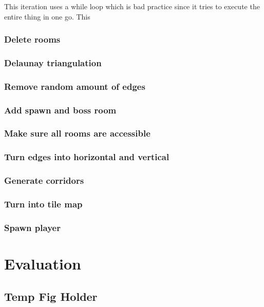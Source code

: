 \documentclass{article}
\begin{document}
This iteration uses a while loop which is bad practice since it tries to execute the entire thing in one go. This 

\subsubsection{Delete rooms}


\subsubsection{Delaunay triangulation}


\subsubsection{Remove random amount of edges}


\subsubsection{Add spawn and boss room}


\subsubsection{Make sure all rooms are accessible}


\subsubsection{Turn edges into horizontal and vertical}


\subsubsection{Generate corridors}


\subsubsection{Turn into tile map}


\subsubsection{Spawn player}

\section{Evaluation}

\pagebreak
\subsection{Temp Fig Holder}
\end{document}
